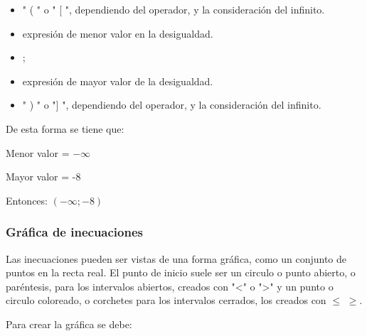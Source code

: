     \begin{itemize}
        \item " ( " o " [ ", dependiendo del operador, y la consideración del infinito.
        \item expresión de menor valor en la desigualdad.
        \item ;
        \item expresión de mayor valor de la desigualdad.
        \item " ) " o "] ", dependiendo del operador, y la consideración del infinito.
    \end{itemize}

    De esta forma se tiene que:

    Menor valor = $-\infty$

    Mayor valor = -8

    Entonces: $(-\infty;-8)$

\subsubsection{Gráfica de inecuaciones} \label{Grafica-inecuaciones}

    Las inecuaciones pueden ser vistas de una forma gráfica, como un
    conjunto de puntos en la recta real. El punto de inicio suele ser un circulo
    o punto abierto, o paréntesis, para los intervalos abiertos, creados con "<" o ">"
    y un punto o circulo coloreado, o corchetes para los intervalos cerrados, los
    creados con $ \leq $ $ \geq $.

    Para crear la gráfica se debe:


